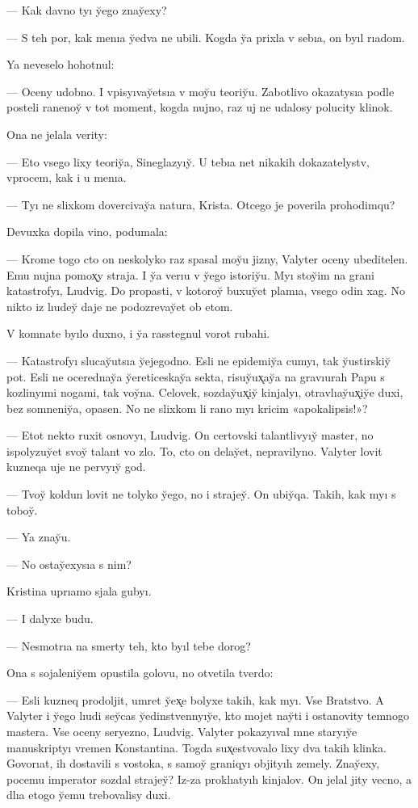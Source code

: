 \documentclass[10pt]{book}
\begin{document}
— Kak davno tyı y̆ego znay̆exy?

— S teh por, kak menıa y̆edva ne ubili. Kogda y̆a prixla v sebıa, on byıl rıadom.

Ya neveselo hohotnul:

— Oceny udobno. I vpisyıvay̆etsıa v moy̆u teoriy̆u. Zabotlivo okazatysıa podle posteli ranenoy̆ v tot moment, kogda nujno, raz uj ne udalosy polucity klinok.

Ona ne jelala verity:

— Eto vsego lixy teoriy̆a, Sineglazyıy̆. U tebıa net nikakih dokazatelystv, vprocem, kak i u menıa.

— Tyı ne slixkom dovercivay̆a natura, Krista. Otcego je poverila prohodimqu?

Devuxka dopila vino, podumala:

— Krome togo cto on neskolyko raz spasal moy̆u jizny, Valyter oceny ubeditelen. Emu nujna pomox̨y straja. I y̆a verıu v y̆ego istoriy̆u. Myı stoy̆im na grani katastrofyı, Lıudvig. Do propasti, v kotoroy̆ buxuy̆et plamıa, vsego odin xag. No nikto iz lıudey̆ daje ne podozrevay̆et ob etom.

V komnate byılo duxno, i y̆a rasstegnul vorot rubahi.

— Katastrofyı slucay̆utsıa y̆ejegodno. Esli ne epidemiy̆a cumyı, tak y̆ustirskiy̆ pot. Esli ne ocerednay̆a y̆ereticeskay̆a sekta, risuy̆ux̨ay̆a na gravıurah Papu s kozlinyımi nogami, tak voy̆na. Celovek, sozday̆ux̨iy̆ kinjalyı, otravlıay̆ux̨iy̆e duxi, bez somneniy̆a, opasen. No ne slixkom li rano myı kricim «apokalipsis!»?

— Etot nekto ruxit osnovyı, Lıudvig. On certovski talantlivyıy̆ master, no ispolyzuy̆et svoy̆ talant vo zlo. To, cto on delay̆et, nepravilyno. Valyter lovit kuzneqa uje ne pervyıy̆ god.

— Tvoy̆ koldun lovit ne tolyko y̆ego, no i strajey̆. On ubiy̆qa. Takih, kak myı s toboy̆.

— Ya znay̆u.

— No ostay̆exysıa s nim?

Kristina uprıamo sjala gubyı.

— I dalyxe budu.

— Nesmotrıa na smerty teh, kto byıl tebe dorog?

Ona s sojaleniy̆em opustila golovu, no otvetila tverdo:

— Esli kuzneq prodoljit, umret y̆ex̨e bolyxe takih, kak myı. Vse Bratstvo. A Valyter i y̆ego lıudi sey̆cas y̆edinstvennyıy̆e, kto mojet nay̆ti i ostanovity temnogo mastera. Vse oceny seryezno, Lıudvig. Valyter pokazyıval mne staryıy̆e manuskriptyı vremen Konstantina. Togda sux̨estvovalo lixy dva takih klinka. Govorıat, ih dostavili s vostoka, s samoy̆ graniqyı objityıh zemely. Znay̆exy, pocemu imperator sozdal strajey̆? Iz-za proklıatyıh kinjalov. On jelal jity vecno, a dlıa etogo y̆emu trebovalisy duxi.
\end{document}
